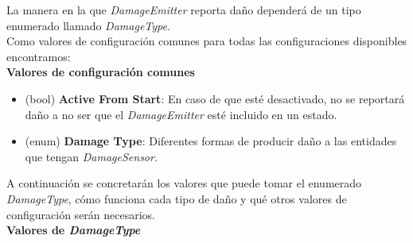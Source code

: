 La manera en la que \textit{DamageEmitter} reporta daño dependerá de un tipo enumerado llamado \textit{DamageType}.\\
Como valores de configuración comunes para todas las configuraciones disponibles encontramos:\\

\textbf{Valores de configuración comunes}
\begin{itemize}
	\item (bool) \textbf{Active From Start}: En caso de que esté desactivado, no se reportará daño a no ser que el \textit{DamageEmitter} esté incluido en un estado.
	\item (enum) \textbf{Damage Type}: Diferentes formas de producir daño a las entidades que tengan \textit{DamageSensor}.
\end{itemize}

A continuación se concretarán los valores que puede tomar el enumerado \textit{DamageType}, cómo funciona cada tipo de daño y qué otros valores de configuración serán necesarios.\\

\textbf{Valores de \textit{DamageType}}

